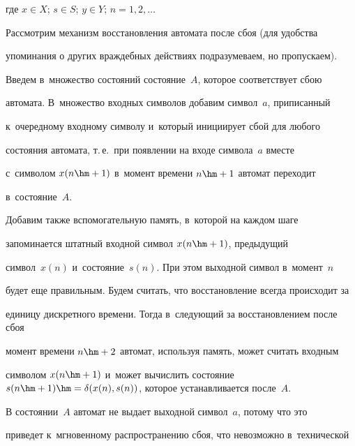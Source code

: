   


  \vspace*{-6pt}


  


  \noindent


где $x \in X$; $s \in S$; $y \in Y$; $n = 1, 2,\ldots$





  Рассмотрим механизм восстановления автомата после сбоя (для удобства 


упоминания о других враж\-деб\-ных действиях подразумеваем, но пропускаем). 


Введем в~множество со\-сто\-яний со\-сто\-яние~$A$, которое соответствует сбою 


автомата. В~множество вход\-ных сим\-во\-лов добавим сим\-вол~$a$, приписанный 


к~очередному вход\-но\-му символу и~который инициирует сбой для любого 


состояния автомата, т.\,е.\ при появлении на входе символа~$a$ вмес\-те 


с~символом $x(n\hm+1)$ в~момент времени $n\hm+1$ автомат переходит  


в~со\-сто\-яние~$A$. 


  


  Добавим также вспомогательную память, в~которой на каж\-дом шаге 


запоминается штат\-ный входной символ $x(n\hm+1)$, предыдущий 


символ~$x(n)$ и~со\-сто\-яние~$s(n)$. При этом выходной символ в~момент~$n$ 


будет еще правильным. Будем считать, что вос\-ста\-нов\-ле\-ние всегда происходит за 


единицу дискретного времени. Тогда в~следующий за вос\-ста\-нов\-ле\-ни\-ем после сбоя 


момент времени $n\hm+2$ автомат, используя память, может считать входным 


символом $x(n\hm+1)$ и~может вы\-чис\-лить со\-сто\-яние $s(n\hm+1) \hm= \delta 


(x(n), s(n))$, которое устанавливается после~$A$.


  


  В состоянии~$A$ автомат не выдает выходной символ~$a$, потому что это 


приведет к~мгновенному распространению сбоя, что не\-воз\-мож\-но в~технической  


